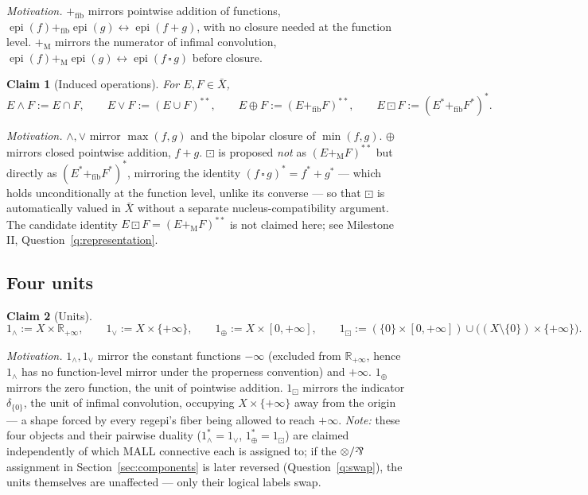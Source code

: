 \documentclass[11pt]{article}
\newtheorem{claim}{Claim}
\newcommand{\Rp}{\mathbb R_{+\infty}}
\newcommand{\epi}{\operatorname{epi}}
\newcommand{\fibsum}{+_{\mathrm{fib}}}
\newcommand{\Msum}{+_{\mathrm M}}
\newcommand{\parr}{\mathbin{\text{\rotatebox[origin=c]{180}{\&}}}}
\begin{document}
\emph{Motivation.} $\fibsum$ mirrors pointwise addition of functions,
$\epi(f)\fibsum\epi(g)\leftrightarrow\epi(f+g)$, with no closure needed at
the function level. $\Msum$ mirrors the numerator of infimal convolution,
$\epi(f)\Msum\epi(g)\leftrightarrow\epi(f\,\square\,g)$ before closure.

\begin{claim}[Induced operations]\label{cl:induced}
For $E,F\in\bar X$,
\[
E\wedge F:=E\cap F,\qquad
E\vee F:=(E\cup F)^{**},\qquad
E\oplus F:=(E\fibsum F)^{**},\qquad
E\boxdot F:=(E^*\fibsum F^*)^*.
\]
\end{claim}

\emph{Motivation.} $\wedge,\vee$ mirror $\max(f,g)$ and the bipolar closure
of $\min(f,g)$. $\oplus$ mirrors closed pointwise addition, $f+g$.
$\boxdot$ is proposed \emph{not} as $(E\Msum F)^{**}$ but directly as
$(E^*\fibsum F^*)^*$, mirroring the identity
$(f\,\square\,g)^*=f^*+g^*$ — which holds unconditionally at the function
level, unlike its converse — so that $\boxdot$ is automatically valued in
$\bar X$ without a separate nucleus-compatibility argument. The candidate
identity $E\boxdot F=(E\Msum F)^{**}$ is not claimed here; see
Milestone II, Question~\ref{q:representation}.

\subsection{Four units}

\begin{claim}[Units]\label{cl:units}
\[
1_\wedge:=X\times\Rp,\qquad
1_\vee:=X\times\{+\infty\},\qquad
1_\oplus:=X\times[0,+\infty],\qquad
1_\boxdot:=(\{0\}\times[0,+\infty])\cup\big((X\setminus\{0\})\times\{+\infty\}\big).
\]
\end{claim}

\emph{Motivation.} $1_\wedge,1_\vee$ mirror the constant functions
$-\infty$ (excluded from $\Rp$, hence $1_\wedge$ has no function-level
mirror under the properness convention) and $+\infty$. $1_\oplus$ mirrors
the zero function, the unit of pointwise addition. $1_\boxdot$ mirrors the
indicator $\delta_{\{0\}}$, the unit of infimal convolution, occupying
$X\times\{+\infty\}$ away from the origin — a shape forced by every
regepi's fiber being allowed to reach $+\infty$. \emph{Note:} these four
objects and their pairwise duality ($1_\wedge^*=1_\vee$,
$1_\oplus^*=1_\boxdot$) are claimed independently of which MALL connective
each is assigned to; if the $\otimes/\parr$ assignment in
Section~\ref{sec:components} is later reversed (Question~\ref{q:swap}),
the units themselves are unaffected — only their logical labels swap.
\end{document}
